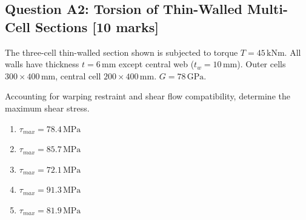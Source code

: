 \documentclass[12pt,a4paper]{article}
\begin{document}
\begin{questionbox}
\subsection*{Question A2: Torsion of Thin-Walled Multi-Cell Sections [10 marks]}
The three-cell thin-walled section shown is subjected to torque $T = 45\,\text{kNm}$.
All walls have thickness $t = 6\,\text{mm}$ except central web ($t_w = 10\,\text{mm}$).
Outer cells $300\times400\,\text{mm}$, central cell $200\times400\,\text{mm}$. $G = 78\,\text{GPa}$.

\begin{center}
\end{center}

Accounting for warping restraint and shear flow compatibility, determine the maximum shear stress.

\begin{mcqbox}
\begin{enumerate}[label=(\Alph*),leftmargin=*]
    \item $\tau_{max} = 78.4\,\text{MPa}$
    \item $\tau_{max} = 85.7\,\text{MPa}$
    \item $\tau_{max} = 72.1\,\text{MPa}$
    \item $\tau_{max} = 91.3\,\text{MPa}$
    \item $\tau_{max} = 81.9\,\text{MPa}$
\end{enumerate}
\end{mcqbox}
\end{questionbox}
\end{document}
